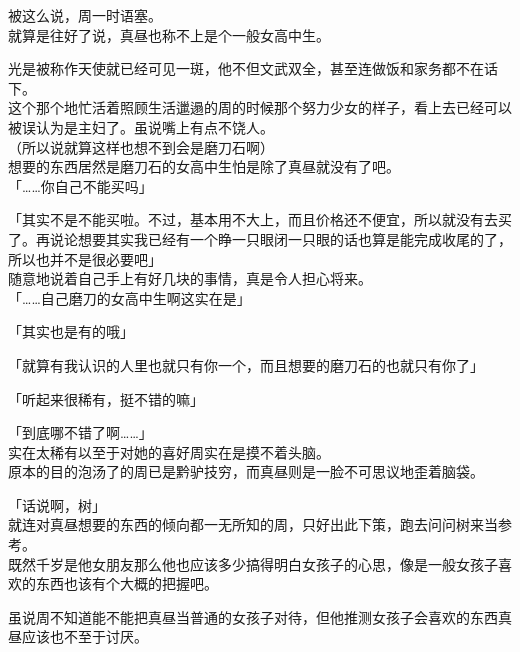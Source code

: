 被这么说，周一时语塞。\\

就算是往好了说，真昼也称不上是个一般女高中生。

光是被称作天使就已经可见一斑，他不但文武双全，甚至连做饭和家务都不在话下。\\

这个那个地忙活着照顾生活邋遢的周的时候那个努力少女的样子，看上去已经可以被误认为是主妇了。虽说嘴上有点不饶人。\\

（所以说就算这样也想不到会是磨刀石啊）\\

想要的东西居然是磨刀石的女高中生怕是除了真昼就没有了吧。\\

「……你自己不能买吗」

「其实不是不能买啦。不过，基本用不大上，而且价格还不便宜，所以就没有去买了。再说论想要其实我已经有一个睁一只眼闭一只眼的话也算是能完成收尾的了，所以也并不是很必要吧」\\

随意地说着自己手上有好几块的事情，真是令人担心将来。\\

「……自己磨刀的女高中生啊这实在是」

「其实也是有的哦」

「就算有我认识的人里也就只有你一个，而且想要的磨刀石的也就只有你了」

「听起来很稀有，挺不错的嘛」

「到底哪不错了啊……」\\

实在太稀有以至于对她的喜好周实在是摸不着头脑。\\

原本的目的泡汤了的周已是黔驴技穷，而真昼则是一脸不可思议地歪着脑袋。\\

\vspace{2\baselineskip}

「话说啊，树」\\

就连对真昼想要的东西的倾向都一无所知的周，只好出此下策，跑去问问树来当参考。\\

既然千岁是他女朋友那么他也应该多少搞得明白女孩子的心思，像是一般女孩子喜欢的东西也该有个大概的把握吧。

虽说周不知道能不能把真昼当普通的女孩子对待，但他推测女孩子会喜欢的东西真昼应该也不至于讨厌。\\


